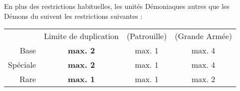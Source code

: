 \newcommand{\soulreaperrule}{%
Les \impacthits{} infligées par la figurine ont la règle \armourpiercing{6}. De plus, l'\oracle{} gagne +1 Attaque pour chaque blessure non sauvegardée causée par ces \impacthits{}. Ces attaques supplémentaires sont perdues à la fin de la Manche de Corps à Corps.
}

\newcommand{\incineratorrule}{%
\textbf{\artilleryweapon} de type \textbf{\flamethrower}.\newline
\range{8}, \Strength{} 4, \flamingattacks{}.

\vspace*{5pt}
La figurine gagne la règle \fireborn{}.
}

\newcommand{\brasscannonrule}{%
Ne peut être pris que si le Général est un \daemonofwrath{}.

\vspace*{5pt}
\textbf{\artilleryweapon} de type \textbf{\cannon{} (\distance{1D6})}.\newline
\range{48}, \Strength{} 10, \flamingattacks{}, \multiplewounds{\ordnance}{}, \armourpiercing{2}.

\vspace*{5pt}
Si le \bloodchariot{} ne fait que des Pivots et n'effectue aucun mouvement supplémentaire, il ne souffre pas de la pénalité pour bouger et tirer.
}

\newcommand{\bloodfeastrule}{%
À chaque fois que cette figurine réussit une charge, tous les Démons du \wrath{} engagés dans le même combat qu'elle gagnent la règle \frenzy{} jusqu'à la fin de la Phase de Corps à Corps.
}

\newcommand{\firstnote}{1}
\newcommand{\secondnote}{2}
\newcommand{\QRSnote}{%
\noindent$^{\firstnote}$ Un membre d'équipage de moins quand il sert de monture.

\noindent$^{\secondnote}$ Pas d'\igniter{} quand il sert de monture.
}












\startarmywiderules

\spaceaftersection{}

En plus des restrictions habituelles, les unités Démoniaques autres que les Démons du \truechaos{} suivent les restrictions suivantes :

\vspace*{0.2cm}
\renewcommand{\arraystretch}{2}
\begin{center}\begin{tabular}{rccc}
\hline
 & Limite de duplication & (Patrouille) & (Grande Armée) \tabularnewline
 Base & \textbf{max. 2} & max. 1 & max. 4 \tabularnewline
 Spéciale & \textbf{max. 2} & max. 1 & max. 4 \tabularnewline
 Rare & \textbf{max. 1} & max. 1 & max. 2 \tabularnewline
\hline
\end{tabular}\end{center}
\renewcommand{\arraystretch}{1.2}
\vspace*{0.2cm}

